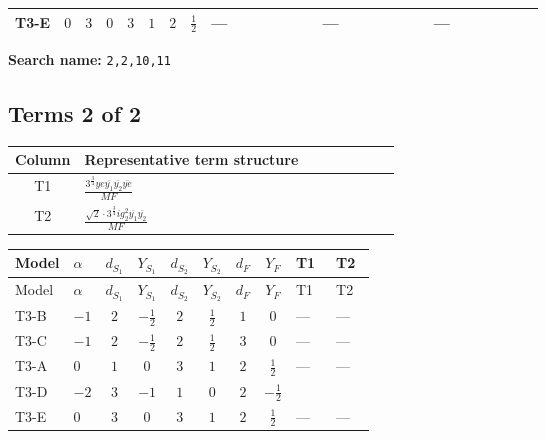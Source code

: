 \documentclass[8pt]{article}
\begin{document}
\begin{landscape}
\begin{longtable}{@{}llcccccc >{\raggedright\arraybackslash}p{0.21\linewidth} >{\raggedright\arraybackslash}p{0.21\linewidth} >{\raggedright\arraybackslash}p{0.21\linewidth}@{}}
\midrule
T3-E & $0$ & $3$ & $0$ & $3$ & $1$ & $2$ & $\frac{1}{2}$ & --- & --- & --- \\
\midrule
\bottomrule
\end{longtable}
\clearpage
\noindent\textbf{Search name: }\texttt{2,2,10,11}\par\smallskip
\subsection*{Terms 2 of 2}
\begin{center}
\begin{tabular}{@{}c >{\raggedright\arraybackslash}p{0.82\linewidth}@{}}
\toprule
Column & Representative term structure \\
\midrule
T1 & \(\displaystyle \frac{3^{\frac{3}{4}} ye \overline{y_{1}} \overline{y_{2}} \overline{ye}}{MF}\) \\
\midrule
T2 & \(\displaystyle \frac{\sqrt{2} \cdot 3^{\frac{3}{4}} i g_{2}^{2} \overline{y_{1}} \overline{y_{2}}}{MF}\) \\
\midrule
\bottomrule
\end{tabular}
\end{center}
\smallskip
\tiny
\begin{longtable}{@{}llcccccc >{\raggedright\arraybackslash}p{0.21\linewidth} >{\raggedright\arraybackslash}p{0.21\linewidth}@{}}
\toprule
Model & $\alpha$ & $d_{S_1}$ & $Y_{S_1}$ & $d_{S_2}$ & $Y_{S_2}$ & $d_F$ & $Y_F$ & T1 & T2 \\
\midrule
\endfirsthead
\toprule
Model & $\alpha$ & $d_{S_1}$ & $Y_{S_1}$ & $d_{S_2}$ & $Y_{S_2}$ & $d_F$ & $Y_F$ & T1 & T2 \\
\midrule
\endhead
T3-B & $-1$ & $2$ & $-\frac{1}{2}$ & $2$ & $\frac{1}{2}$ & $1$ & $0$ & --- & --- \\
\midrule
T3-C & $-1$ & $2$ & $-\frac{1}{2}$ & $2$ & $\frac{1}{2}$ & $3$ & $0$ & --- & --- \\
\midrule
T3-A & $0$ & $1$ & $0$ & $3$ & $1$ & $2$ & $\frac{1}{2}$ & --- & --- \\
\midrule
T3-D & $-2$ & $3$ & $-1$ & $1$ & $0$ & $2$ & $-\frac{1}{2}$ & \scriptsize\adjustbox{max width=\linewidth}{$\begin{gathered} \frac{3^{\frac{3}{4}} ye \overline{y_{1}} \overline{y_{2}} \overline{ye}}{12 MF}\end{gathered}$} & \scriptsize\adjustbox{max width=\linewidth}{$\begin{gathered} \frac{\sqrt{2} \cdot 3^{\frac{3}{4}} i g_{2}^{2} \overline{y_{1}} \overline{y_{2}}}{3 MF}\end{gathered}$} \\
\midrule
T3-E & $0$ & $3$ & $0$ & $3$ & $1$ & $2$ & $\frac{1}{2}$ & --- & --- \\
\midrule
\bottomrule
\end{longtable}
\clearpage

\end{landscape}
\end{document}
